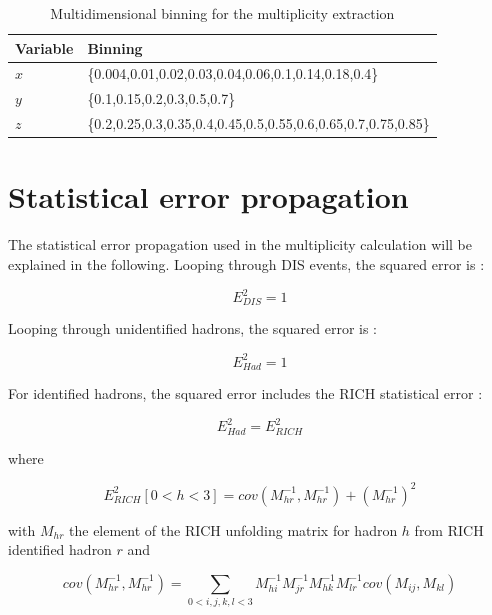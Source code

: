 \begin{table}[!h]
  \centering
  \caption{Multidimensional binning for the multiplicity extraction}
  \label{tab:kinbinning}
  \begin{tabular}{ll}
    \hline
    \hline
    Variable & Binning \\
    \hline
    \hline
    $x$ & \{0.004,0.01,0.02,0.03,0.04,0.06,0.1,0.14,0.18,0.4\} \\
    $y$ & \{0.1,0.15,0.2,0.3,0.5,0.7\} \\
    $z$ & \{0.2,0.25,0.3,0.35,0.4,0.45,0.5,0.55,0.6,0.65,0.7,0.75,0.85\} \\
    \hline
    \hline
  \end{tabular}
\end{table}


\section{Statistical error propagation}

The statistical error propagation used in the multiplicity calculation will be explained in the following. Looping through DIS events, the squared error is :

\begin{equation}
		E^2_{DIS} = 1
\end{equation}

Looping through unidentified hadrons, the squared error is :

\begin{equation}
		E^2_{Had} = 1
\end{equation}

For identified hadrons, the squared error includes the RICH statistical error :

\begin{equation}
		E^2_{Had} = E^2_{RICH}
\end{equation}

where

\begin{equation}
		E^2_{RICH}[0<h<3] = cov(M^{-1}_{hr},M^{-1}_{hr})+(M^{-1}_{hr})^2
\end{equation}

with $M_{hr}$ the element of the RICH unfolding matrix for hadron $h$ from RICH identified hadron $r$ and

\begin{equation}
		cov(M^{-1}_{hr},M^{-1}_{hr}) = \sum_{0<i,j,k,l<3} M^{-1}_{hi}M^{-1}_{jr}M^{-1}_{hk}M^{-1}_{lr}cov(M_{ij},M_{kl})
\end{equation}

